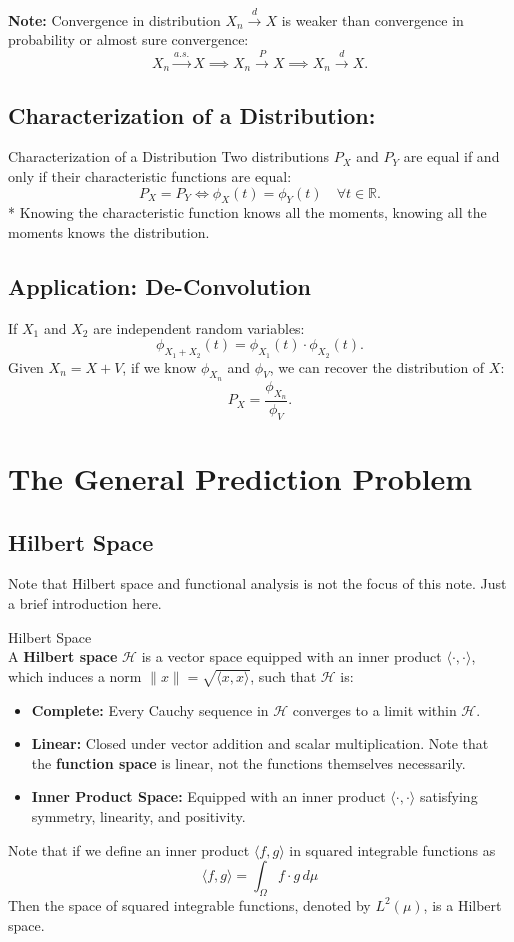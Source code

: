 \noindent \textbf{Note:} Convergence in distribution $X_n \xrightarrow{d} X$ is weaker than convergence in probability or almost sure convergence:
\[
X_n \xrightarrow{a.s.} X \implies X_n \xrightarrow{P} X \implies X_n \xrightarrow{d} X.
\]

\subsection{Characterization of a Distribution:}
\begin{thm}{Characterization of a Distribution}
Two distributions $P_X$ and $P_Y$ are equal if and only if their characteristic functions are equal:
\[
P_X = P_Y \iff \phi_X(t) = \phi_Y(t) \quad \forall t \in \mathbb{R}.
\]
* Knowing the characteristic function knows all the moments, knowing all the moments knows the distribution. 
\end{thm}


\subsection{Application: De-Convolution}
\noindent If $X_1$ and $X_2$ are independent random variables:
\[
\phi_{X_1 + X_2}(t) = \phi_{X_1}(t) \cdot \phi_{X_2}(t).
\]
Given $X_n = X + V$, if we know $\phi_{X_n}$ and $\phi_V$, we can recover the distribution of $X$:
\[
P_X = \frac{\phi_{X_n}}{\phi_V}.
\]


\newpage
\section{The General Prediction Problem}
\subsection{Hilbert Space}
Note that Hilbert space and functional analysis is not the focus of this note. Just a brief introduction here. 

\begin{df}{Hilbert Space}\\
A \textbf{Hilbert space} $\mathscr{H}$ is a vector space equipped with an inner product $\langle \cdot, \cdot \rangle$, which induces a norm $\| x \| = \sqrt{\langle x, x \rangle}$, such that $\mathscr{H}$ is:
\begin{itemize}
    \item \textbf{Complete:} Every Cauchy sequence in $\mathscr{H}$ converges to a limit within $\mathscr{H}$.
    \item \textbf{Linear:} Closed under vector addition and scalar multiplication. Note that the \textbf{function space} is linear, not the functions themselves necessarily. 
    \item \textbf{Inner Product Space:} Equipped with an inner product $\langle \cdot, \cdot \rangle$ satisfying symmetry, linearity, and positivity.
\end{itemize}
Note that if we define an inner product $\langle f, g \rangle$ in squared integrable functions as 
$$\langle f, g \rangle = \int_\Omega f\cdot g\, d\mu$$
Then the space of squared integrable functions, denoted by $L^2(\mu)$, is a Hilbert space. 
\end{df}



